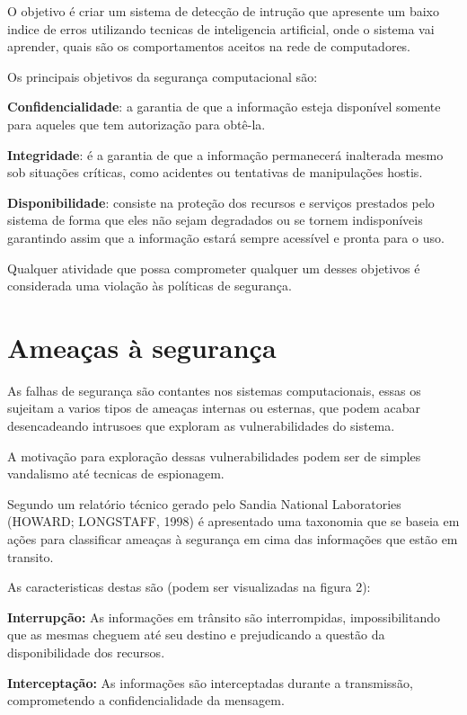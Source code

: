 \documentclass[
	12pt,				%
	openright,			%
	oneside,
	a4paper,			%
	english,			%
	french,				%
	spanish,			%
	brazil				%
	]{abntex2}
\begin{document}
O objetivo é criar um sistema de detecção de intrução que apresente um baixo indice de erros utilizando tecnicas de inteligencia artificial, onde o sistema vai aprender, quais são os comportamentos aceitos na rede de computadores.

Os principais objetivos da segurança computacional são:

\textbf{Confidencialidade}: a garantia de que a informação esteja disponível somente para aqueles que tem autorização para obtê-la.

\textbf{Integridade}: é a garantia de que a informação permanecerá inalterada mesmo sob situações críticas, como acidentes ou tentativas de manipulações hostis.

\textbf{Disponibilidade}: consiste na proteção dos recursos e serviços prestados pelo sistema de forma que eles não sejam degradados ou se tornem indisponíveis garantindo assim que a informação estará sempre acessível e pronta para o uso.



Qualquer atividade que possa comprometer qualquer um desses
objetivos é considerada uma violação às políticas de segurança.

 \section{Ameaças à segurança}

 As falhas de segurança são contantes nos sistemas computacionais, essas os sujeitam a varios tipos de ameaças internas ou esternas, que podem acabar desencadeando intrusoes que exploram as vulnerabilidades do sistema.  

 A motivação para exploração dessas vulnerabilidades podem ser de simples vandalismo até tecnicas de espionagem.

Segundo um relatório técnico gerado pelo Sandia National Laboratories (HOWARD; LONGSTAFF, 1998) é apresentado uma taxonomia que se baseia em ações para classificar ameaças à segurança em cima das informações que estão em transito. 

As caracteristicas destas são (podem ser visualizadas na figura 2):

\textbf{Interrupção:} As informações em trânsito são interrompidas, impossibilitando que as mesmas cheguem até seu destino e prejudicando a questão da disponibilidade dos recursos.

\textbf{Interceptação:} As informações são interceptadas durante a transmissão, comprometendo a confidencialidade da mensagem.
\end{document}
